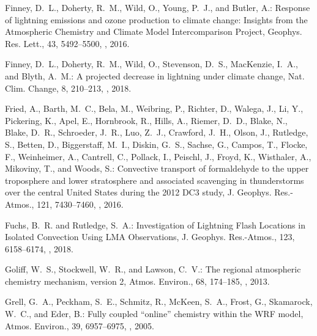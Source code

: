 \documentclass[amt]{copernicus}
\begin{document}
\begin{thebibliography}{105}
Finney, D.~L., Doherty, R.~M., Wild, O., Young, P.~J., and Butler, A.: Response
  of lightning  emissions and ozone production to climate change: Insights
  from the Atmospheric Chemistry and Climate Model Intercomparison Project,
  Geophys. Res. Lett., 43, 5492--5500, ,
  2016.

Finney, D.~L., Doherty, R.~M., Wild, O., Stevenson, D.~S., MacKenzie, I.~A.,
  and Blyth, A.~M.: A projected decrease in lightning under climate change,
  Nat. Clim. Change, 8, 210--213, , 2018.

Fried, A., Barth, M.~C., Bela, M., Weibring, P., Richter, D., Walega, J., Li,
  Y., Pickering, K., Apel, E., Hornbrook, R., Hills, A., Riemer, D.~D., Blake,
  N., Blake, D.~R., Schroeder, J.~R., Luo, Z.~J., Crawford, J.~H., Olson, J.,
  Rutledge, S., Betten, D., Biggerstaff, M.~I., Diskin, G.~S., Sachse, G.,
  Campos, T., Flocke, F., Weinheimer, A., Cantrell, C., Pollack, I., Peischl,
  J., Froyd, K., Wisthaler, A., Mikoviny, T., and Woods, S.: Convective
  transport of formaldehyde to the upper troposphere and lower stratosphere and
  associated scavenging in thunderstorms over the central United States during
  the 2012 DC3 study, J. Geophys. Res.-Atmos., 121,
  7430--7460, , 2016.

Fuchs, B.~R. and Rutledge, S.~A.: Investigation of Lightning Flash Locations in
  Isolated Convection Using LMA Observations, J. Geophys. Res.-Atmos., 123, 6158--6174, , 2018.

Goliff, W.~S., Stockwell, W.~R., and Lawson, C.~V.: The regional atmospheric
  chemistry mechanism, version 2, Atmos. Environ., 68, 174--185,
  , 2013.

Grell, G.~A., Peckham, S.~E., Schmitz, R., McKeen, S.~A., Frost, G., Skamarock,
  W.~C., and Eder, B.: Fully coupled ``online'' chemistry within the WRF
  model, Atmos. Environ., 39, 6957--6975,
  , 2005.


\end{thebibliography}
\end{document}
